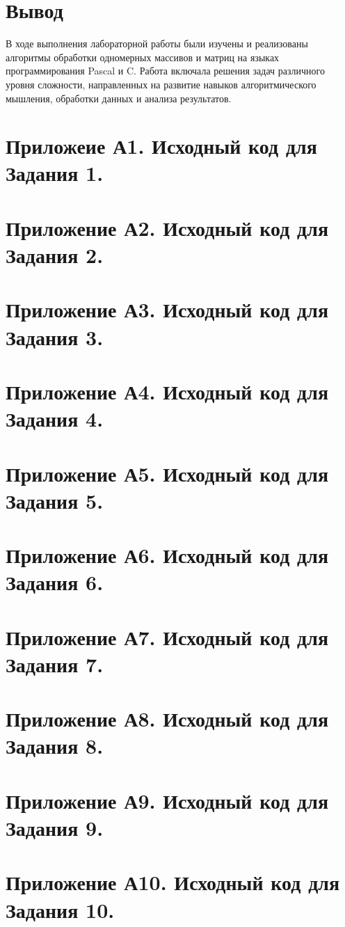 \documentclass[oneside,a4paper,14pt]{extarticle}
\begin{document}
\section*{Вывод}
В ходе выполнения лабораторной работы были изучены и реализованы алгоритмы
обработки одномерных массивов и матриц на языках программирования Pascal и C.
Работа включала решения задач различного уровня сложности, направленных на
развитие навыков алгоритмического мышления, обработки данных и анализа
результатов.\\

\section*{Приложеие А1. Исходный код для Задания 1.}
\section*{Приложение А2. Исходный код для Задания 2.}
\section*{Приложение А3. Исходный код для Задания 3.}
\section*{Приложение А4. Исходный код для Задания 4.}
\section*{Приложение А5. Исходный код для Задания 5.}
\section*{Приложение А6. Исходный код для Задания 6.}
\section*{Приложение А7. Исходный код для Задания 7.}
\section*{Приложение А8. Исходный код для Задания 8.}
\section*{Приложение А9. Исходный код для Задания 9.}
\section*{Приложение А10. Исходный код для Задания 10.}
\end{document}
